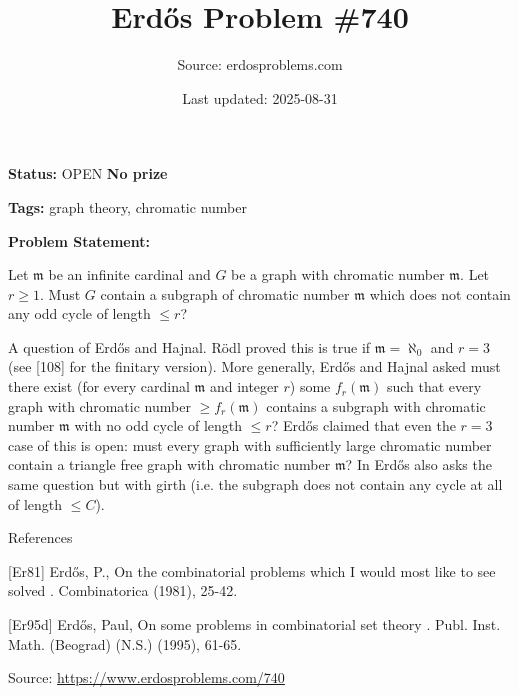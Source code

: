 \documentclass{article}
\title{Erd\H{o}s Problem \#740}
\date{Last updated: 2025-08-31}
\author{Source: erdosproblems.com}
\begin{document}
\maketitle

\noindent\textbf{Status:} OPEN \quad \textbf{No prize}

\noindent\textbf{Tags:} graph theory, chromatic number

\medskip

\noindent\textbf{Problem Statement:}

Let $\mathfrak{m}$ be an infinite cardinal and $G$ be a graph with chromatic number $\mathfrak{m}$. Let $r\geq 1$. Must $G$ contain a subgraph of chromatic number $\mathfrak{m}$ which does not contain any odd cycle of length $\leq r$?




A question of Erd\H{o}s and Hajnal. R\"{o}dl proved this is true if $\mathfrak{m}=\aleph_0$ and $r=3$ (see [108] for the finitary version). More generally, Erd\H{o}s and Hajnal asked must there exist (for every cardinal $\mathfrak{m}$ and integer $r$) some $f_r(\mathfrak{m})$ such that every graph with chromatic number $\geq f_r(\mathfrak{m})$ contains a subgraph with chromatic number $\mathfrak{m}$ with no odd cycle of length $\leq r$? Erd\H{o}s \cite{Er95d} claimed that even the $r=3$ case of this is open: must every graph with sufficiently large chromatic number contain a triangle free graph with chromatic number $\mathfrak{m}$? In \cite{Er81} Erd\H{o}s also asks the same question but with girth (i.e. the subgraph does not contain any cycle at all of length $\leq C$).




References

[Er81] Erd\H{o}s, P., On the combinatorial problems which I would most like to see solved . Combinatorica (1981), 25-42.

[Er95d] Erd\H{o}s, Paul, On some problems in combinatorial set theory . Publ. Inst. Math. (Beograd) (N.S.) (1995), 61-65.


\bigskip
\noindent\small{Source: \url{https://www.erdosproblems.com/740}}
\end{document}
